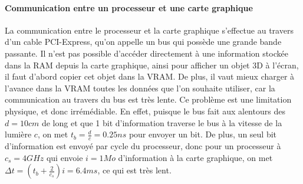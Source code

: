 \documentclass[a4paper,10pt]{report}
\begin{document}
\paragraph{Communication entre un processeur et une carte graphique}
La communication entre le processeur et la carte graphique s'effectue au travers d'un cable PCI-Express, qu'on appelle un bus qui possède une grande bande passante. Il n'est pas possible d'accéder directement à une information stockée dans la RAM depuis la carte graphique, ainsi pour afficher un objet 3D à l'écran, il faut d'abord copier cet objet dans la VRAM. De plus, il vaut mieux charger à l'avance dans la VRAM toutes les données que l'on souhaite utiliser, car la communication au travers du bus est très lente. Ce problème est une limitation physique, et donc irrémédiable. En effet, puisque le bus fait aux alentours des $d = 10cm$ de long et que 1 bit d'information traverse le bus à la vitesse de la lumière $c$, on met $t_b = \frac{d}{c}=0.25ns$ pour envoyer un bit. De plus, un seul bit d'information est envoyé par cycle du processeur, donc pour un processeur à $c_s = 4GHz$ qui envoie $i=1Mo$ d'information à la carte graphique, on met $\Delta t = (t_b + \frac{2}{c_s})i = 6.4ms$, ce qui est très lent.
\end{document}
